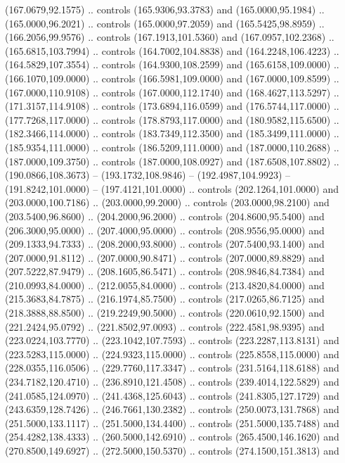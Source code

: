   (167.0679,92.1575) .. controls (165.9306,93.3783) and (165.0000,95.1984) ..
  (165.0000,96.2021) .. controls (165.0000,97.2059) and (165.5425,98.8959) ..
  (166.2056,99.9576) .. controls (167.1913,101.5360) and (167.0957,102.2368) ..
  (165.6815,103.7994) .. controls (164.7002,104.8838) and (164.2248,106.4223) ..
  (164.5829,107.3554) .. controls (164.9300,108.2599) and (165.6158,109.0000) ..
  (166.1070,109.0000) .. controls (166.5981,109.0000) and (167.0000,109.8599) ..
  (167.0000,110.9108) .. controls (167.0000,112.1740) and (168.4627,113.5297) ..
  (171.3157,114.9108) .. controls (173.6894,116.0599) and (176.5744,117.0000) ..
  (177.7268,117.0000) .. controls (178.8793,117.0000) and (180.9582,115.6500) ..
  (182.3466,114.0000) .. controls (183.7349,112.3500) and (185.3499,111.0000) ..
  (185.9354,111.0000) .. controls (186.5209,111.0000) and (187.0000,110.2688) ..
  (187.0000,109.3750) .. controls (187.0000,108.0927) and (187.6508,107.8802) ..
  (190.0866,108.3673) -- (193.1732,108.9846) -- (192.4987,104.9923) --
  (191.8242,101.0000) -- (197.4121,101.0000) .. controls (202.1264,101.0000) and
  (203.0000,100.7186) .. (203.0000,99.2000) .. controls (203.0000,98.2100) and
  (203.5400,96.8600) .. (204.2000,96.2000) .. controls (204.8600,95.5400) and
  (206.3000,95.0000) .. (207.4000,95.0000) .. controls (208.9556,95.0000) and
  (209.1333,94.7333) .. (208.2000,93.8000) .. controls (207.5400,93.1400) and
  (207.0000,91.8112) .. (207.0000,90.8471) .. controls (207.0000,89.8829) and
  (207.5222,87.9479) .. (208.1605,86.5471) .. controls (208.9846,84.7384) and
  (210.0993,84.0000) .. (212.0055,84.0000) .. controls (213.4820,84.0000) and
  (215.3683,84.7875) .. (216.1974,85.7500) .. controls (217.0265,86.7125) and
  (218.3888,88.8500) .. (219.2249,90.5000) .. controls (220.0610,92.1500) and
  (221.2424,95.0792) .. (221.8502,97.0093) .. controls (222.4581,98.9395) and
  (223.0224,103.7770) .. (223.1042,107.7593) .. controls (223.2287,113.8131) and
  (223.5283,115.0000) .. (224.9323,115.0000) .. controls (225.8558,115.0000) and
  (228.0355,116.0506) .. (229.7760,117.3347) .. controls (231.5164,118.6188) and
  (234.7182,120.4710) .. (236.8910,121.4508) .. controls (239.4014,122.5829) and
  (241.0585,124.0970) .. (241.4368,125.6043) .. controls (241.8305,127.1729) and
  (243.6359,128.7426) .. (246.7661,130.2382) .. controls (250.0073,131.7868) and
  (251.5000,133.1117) .. (251.5000,134.4400) .. controls (251.5000,135.7488) and
  (254.4282,138.4333) .. (260.5000,142.6910) .. controls (265.4500,146.1620) and
  (270.8500,149.6927) .. (272.5000,150.5370) .. controls (274.1500,151.3813) and
